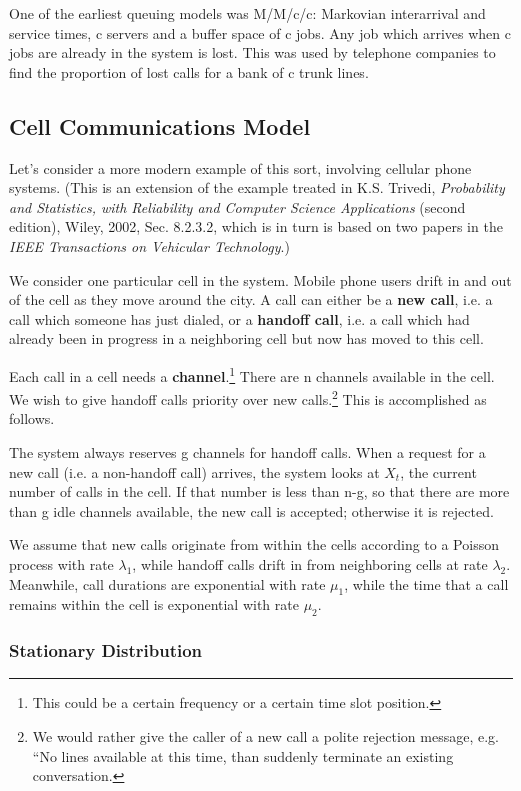 One of the earliest queuing models was M/M/c/c:  Markovian interarrival
and service times, c servers and a buffer space of c jobs.  Any job
which arrives when c jobs are already in the system is lost.  This was
used by telephone companies to find the proportion of lost calls for a
bank of c trunk lines.

\subsection{Cell Communications Model}

Let's consider a more modern example of this sort, involving cellular
phone systems.  (This is an extension of the example treated in K.S.
Trivedi, {\it Probability and Statistics, with Reliability and Computer
Science Applications} (second edition), Wiley, 2002, Sec. 8.2.3.2, which
is in turn is based on two papers in the {\it IEEE Transactions on
Vehicular Technology}.)

We consider one particular cell in the system.  Mobile phone users drift
in and out of the cell as they move around the city.  A call can either
be a {\bf new call}, i.e. a call which someone has just dialed, or a
{\bf handoff call}, i.e. a call which had already been in progress in a
neighboring cell but now has moved to this cell.

Each call in a cell needs a {\bf channel}.\footnote{This could be a
certain frequency or a certain time slot position.} There are n channels
available in the cell.  We wish to give handoff calls priority over new
calls.\footnote{We would rather give the caller of a new call a polite
rejection message, e.g. ``No lines available at this time, than suddenly
terminate an existing conversation.}  This is accomplished as follows.

The system always reserves g channels for handoff calls.  When a request
for a new call (i.e. a non-handoff call) arrives, the system looks at
$X_t$, the current number of calls in the cell.  If that number is less
than n-g, so that there are more than g idle channels available, the new
call is accepted; otherwise it is rejected.

We assume that new calls originate from within the cells according to a
Poisson process with rate $\lambda_1$, while handoff calls drift in from
neighboring cells at rate $\lambda_2$.  Meanwhile, call durations are
exponential with rate $\mu_1$, while the time that a call remains within
the cell is exponential with rate $\mu_2$.

\subsubsection{Stationary Distribution}

